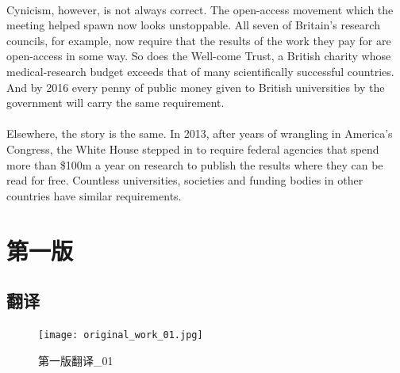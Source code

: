 \documentclass[a4paper, 12pt, UTF8]{article}
\begin{document}
\paragraph*{}
    Cynicism, however, is not always correct. The open-access movement which the meeting helped spawn now looks unstoppable. All seven of Britain’s research councils, for example, now require that the results of the work they pay for are open-access in some way. So does the Well-come Trust, a British charity whose medical-research budget exceeds that of many scientifically successful countries. And by 2016 every penny of public money given to British universities by the government will carry the same requirement.

\paragraph*{}
    Elsewhere, the story is the same. In 2013, after years of wrangling in America’s Congress, the White House stepped in to require federal agencies that spend more than \$100m a year on research to publish the results where they can be read for free. Countless universities, societies and funding bodies in other countries have similar requirements.

\newpage
\section{第一版}
\subsection{翻译}
\begin{figure}[H]
    \centering
    \texttt{[image: original\_work\_01.jpg]}
    \caption{第一版翻译\_01}
    \label{Fig:1}
\end{figure}
\end{document}
